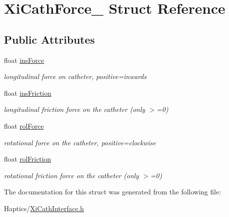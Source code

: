 \hypertarget{structXiCathForce__}{
\section{XiCathForce\_\- Struct Reference}
\label{structXiCathForce__}
}
\subsection*{Public Attributes}
\begin{DoxyCompactItemize}
\item 
\hypertarget{structXiCathForce___aaf69d7a21eabd6c89e6150d102a17955}{
float \hyperlink{structXiCathForce___aaf69d7a21eabd6c89e6150d102a17955}{insForce}}
\label{structXiCathForce___aaf69d7a21eabd6c89e6150d102a17955}

\begin{DoxyCompactList}\small\item\em longitudinal force on catheter, positive=inwards \item\end{DoxyCompactList}\item 
\hypertarget{structXiCathForce___ada4d4473e6406d6482adef2523b5daac}{
float \hyperlink{structXiCathForce___ada4d4473e6406d6482adef2523b5daac}{insFriction}}
\label{structXiCathForce___ada4d4473e6406d6482adef2523b5daac}

\begin{DoxyCompactList}\small\item\em longitudinal friction force on the catheter (only $>$=0) \item\end{DoxyCompactList}\item 
\hypertarget{structXiCathForce___a2cb1ed92b272704e0a74947df5684da8}{
float \hyperlink{structXiCathForce___a2cb1ed92b272704e0a74947df5684da8}{rolForce}}
\label{structXiCathForce___a2cb1ed92b272704e0a74947df5684da8}

\begin{DoxyCompactList}\small\item\em rotational force on the catheter, positive=clockwise \item\end{DoxyCompactList}\item 
\hypertarget{structXiCathForce___a2f24e8a5ff6eaa3c25a6687e03f653c7}{
float \hyperlink{structXiCathForce___a2f24e8a5ff6eaa3c25a6687e03f653c7}{rolFriction}}
\label{structXiCathForce___a2f24e8a5ff6eaa3c25a6687e03f653c7}

\begin{DoxyCompactList}\small\item\em rotational friction force on the catheter (only $>$=0) \item\end{DoxyCompactList}\end{DoxyCompactItemize}


The documentation for this struct was generated from the following file:\begin{DoxyCompactItemize}
\item 
Haptics/\hyperlink{XiCathInterface_8h}{XiCathInterface.h}\end{DoxyCompactItemize}
